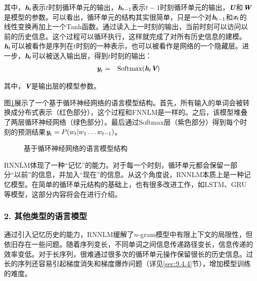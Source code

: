 \noindent  其中，$ {\textbf{\em h}}_t $表示$ t $时刻循环单元的输出，$ {\textbf{\em h}}_{t-1} $表示$ t-1 $时刻循环单元的输出，${\textbf{\em U}}$和${\textbf{\em W}}$是模型的参数。可以看出，循环单元的结构其实很简单，只是一个对$ {\textbf{\em h}}_{t-1} $和$ {\textbf{\em x}}_t $的线性变换再加上一个Tanh函数。通过读入上一时刻的输出，当前时刻可以访问以前的历史信息。这个过程可以循环执行，这样就完成了对所有历史信息的建模。$ {\textbf{\em h}}_t $可以被看作是序列在$ t $时刻的一种表示，也可以被看作是网络的一个隐藏层。进一步，$ {\textbf{\em h}}_t $可以被送入输出层，得到$ t $时刻的输出：
\begin{eqnarray}
{\textbf{\em y}}_t&=&{\textrm{Softmax}}({\textbf{\em h}}_t{\textbf{\em V}})
\label{eq:9-64}
\end{eqnarray}

\noindent  其中，${\textbf{\em V}}$是输出层的模型参数。

\parinterval  图\ref{fig:9-62}展示了一个基于循环神经网络的语言模型结构。首先，所有输入的单词会被转换成分布式表示（红色部分），这个过程和FNNLM是一样的。之后，该模型堆叠了两层循环神经网络（绿色部分）。最后通过Softmax层（紫色部分）得到每个时刻的预测结果$ {\textbf{\em y}}_t={P}(w_t|w_1\dots w_{t-1}) $。

\begin{figure}[htp]
\centering

\caption{基于循环神经网络的语言模型结构}
\label{fig:9-62}
\end{figure}

\parinterval  RNNLM体现了一种“记忆”的能力。对于每一个时刻，循环单元都会保留一部分“以前”的信息，并加入“现在”的信息。从这个角度说，RNNLM本质上是一种记忆模型。在简单的循环单元结构的基础上，也有很多改进工作，如LSTM、GRU等模型，这部分内容将会在{\chapterten}进行介绍。


\subsubsection{2. 其他类型的语言模型}\label{sec:9.5.2.2}

\parinterval  通过引入记忆历史的能力，RNNLM缓解了$n$-gram模型中有限上下文的局限性，但依旧存在一些问题。随着序列变长，不同单词之间信息传递路径变长，信息传递的效率变低。对于长序列，很难通过很多次的循环单元操作保留很长的历史信息。过长的序列还容易引起梯度消失和梯度爆炸问题（详见\ref{sec:9.4.4}节），增加模型训练的难度。

